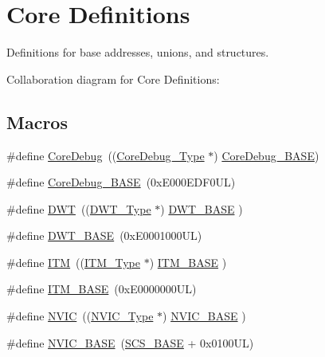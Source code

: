 \hypertarget{group__CMSIS__core__base}{}\section{Core Definitions}
\label{group__CMSIS__core__base}


Definitions for base addresses, unions, and structures.  


Collaboration diagram for Core Definitions\+:
\subsection*{Macros}
\begin{DoxyCompactItemize}
\item 
\#define \hyperlink{group__CMSIS__core__base_gab6e30a2b802d9021619dbb0be7f5d63d}{Core\+Debug}~((\hyperlink{structCoreDebug__Type}{Core\+Debug\+\_\+\+Type} $\ast$)     \hyperlink{group__CMSIS__core__base_ga680604dbcda9e9b31a1639fcffe5230b}{Core\+Debug\+\_\+\+B\+A\+SE})
\item 
\#define \hyperlink{group__CMSIS__core__base_ga680604dbcda9e9b31a1639fcffe5230b}{Core\+Debug\+\_\+\+B\+A\+SE}~(0x\+E000\+E\+D\+F0\+U\+L)
\item 
\#define \hyperlink{group__CMSIS__core__base_gabbe5a060185e1d5afa3f85b14e10a6ce}{D\+WT}~((\hyperlink{structDWT__Type}{D\+W\+T\+\_\+\+Type}       $\ast$)     \hyperlink{group__CMSIS__core__base_gafdab534f961bf8935eb456cb7700dcd2}{D\+W\+T\+\_\+\+B\+A\+SE}      )
\item 
\#define \hyperlink{group__CMSIS__core__base_gafdab534f961bf8935eb456cb7700dcd2}{D\+W\+T\+\_\+\+B\+A\+SE}~(0x\+E0001000\+U\+L)
\item 
\#define \hyperlink{group__CMSIS__core__base_gabae7cdf882def602cb787bb039ff6a43}{I\+TM}~((\hyperlink{structITM__Type}{I\+T\+M\+\_\+\+Type}       $\ast$)     \hyperlink{group__CMSIS__core__base_gadd76251e412a195ec0a8f47227a8359e}{I\+T\+M\+\_\+\+B\+A\+SE}      )
\item 
\#define \hyperlink{group__CMSIS__core__base_gadd76251e412a195ec0a8f47227a8359e}{I\+T\+M\+\_\+\+B\+A\+SE}~(0x\+E0000000\+U\+L)
\item 
\#define \hyperlink{group__CMSIS__core__base_gac8e97e8ce56ae9f57da1363a937f8a17}{N\+V\+IC}~((\hyperlink{structNVIC__Type}{N\+V\+I\+C\+\_\+\+Type}      $\ast$)     \hyperlink{group__CMSIS__core__base_gaa0288691785a5f868238e0468b39523d}{N\+V\+I\+C\+\_\+\+B\+A\+SE}     )
\item 
\#define \hyperlink{group__CMSIS__core__base_gaa0288691785a5f868238e0468b39523d}{N\+V\+I\+C\+\_\+\+B\+A\+SE}~(\hyperlink{group__CMSIS__core__base_ga3c14ed93192c8d9143322bbf77ebf770}{S\+C\+S\+\_\+\+B\+A\+SE} +  0x0100\+U\+L)

\end{DoxyCompactItemize}
